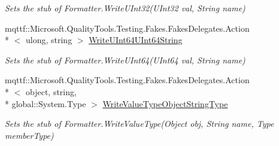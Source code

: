 \begin{DoxyCompactItemize}
\begin{DoxyCompactList}\small\item\em Sets the stub of Formatter.\-Write\-U\-Int32(\-U\-Int32 val, String name)\end{DoxyCompactList}\item 
mqttf\-::\-Microsoft.\-Quality\-Tools.\-Testing.\-Fakes.\-Fakes\-Delegates.\-Action\\*
$<$ ulong, string $>$ \hyperlink{class_system_1_1_runtime_1_1_serialization_1_1_fakes_1_1_stub_formatter_a959aa57e49013f86d50772dcf917428d}{Write\-U\-Int64\-U\-Int64\-String}
\begin{DoxyCompactList}\small\item\em Sets the stub of Formatter.\-Write\-U\-Int64(\-U\-Int64 val, String name)\end{DoxyCompactList}\item 
mqttf\-::\-Microsoft.\-Quality\-Tools.\-Testing.\-Fakes.\-Fakes\-Delegates.\-Action\\*
$<$ object, string, \\*
global\-::\-System.\-Type $>$ \hyperlink{class_system_1_1_runtime_1_1_serialization_1_1_fakes_1_1_stub_formatter_a42df79e1f6427e5fe952d01b67e35b70}{Write\-Value\-Type\-Object\-String\-Type}
\begin{DoxyCompactList}\small\item\em Sets the stub of Formatter.\-Write\-Value\-Type(\-Object obj, String name, Type member\-Type)\end{DoxyCompactList}\end{DoxyCompactItemize}
